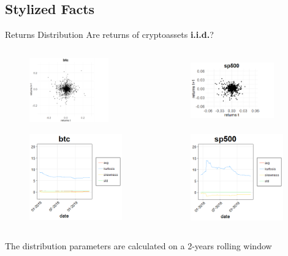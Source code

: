 \documentclass[c, 10pt]{beamer}
\begin{document}
\subsection{Stylized Facts}
\begin{frame}{Returns Distribution}
Are returns of cryptoassets \textbf{i.i.d.}?
	\begin{columns}
		\begin{column}{0.5\textwidth}
		\begin{figure}
			\includegraphics[width=3.4cm]{Images/lagbtc}
		\end{figure}
		\begin{figure}
			\includegraphics[width=4cm]{Images/btc _lag1d_200.png}
		\end{figure}
		\end{column}
		\begin{column}{0.5\textwidth}  %
		\begin{figure}
			\includegraphics[width=3.6cm, height=2.8cm]{Images/lagsp500}
		\end{figure}
		\begin{figure}
			\includegraphics[width=4cm]{Images/sp500 _lag1d_200}
		\end{figure}
		\end{column}
	\end{columns}
	The distribution parameters are calculated on a 2-years rolling window
\end{frame}
\end{document}
